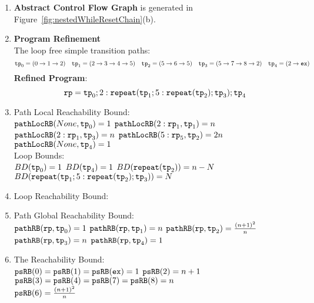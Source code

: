 \begin{enumerate}
  \item  \textbf{Abstract Control Flow Graph} is generated in Figure~\ref{fig:nestedWhileResetChain}(b).

  \item \textbf{Program Refinement}
  \\
  The loop free simple transition paths:
  \[
          \mathtt{tp}_0 = (0 \to 1 \to 2)
          \quad
          \mathtt{tp}_1 = (2 \to 3 \to 4 \to 5)
          \quad           
          \mathtt{tp}_2 = (5 \to 6 \to 5)
          \quad
          \mathtt{tp}_3 = (5 \to 7 \to 8 \to 2)
          \quad
          \mathtt{tp}_4 = (2 \to \mathtt{ex})
      \]
  \textbf{Refined Program}:
  \[
  \mathtt{rp} = \mathtt{tp}_0 ; 2: \mathtt{repeat}(\mathtt{tp}_1; 5: \mathtt{repeat}(\mathtt{tp}_2); \mathtt{tp}_3); \mathtt{tp}_4
  \]
\item {Path Local Reachability Bound}:
\\
$\mathtt{pathLocRB}(None, \mathtt{tp}_0) = 1$ \quad
$\mathtt{pathLocRB}(2: \mathtt{rp}_1, \mathtt{tp}_1) = n$ \quad
$\mathtt{pathLocRB}(2: \mathtt{rp}_1, \mathtt{tp}_3) = n$ \quad
$\mathtt{pathLocRB}(5: \mathtt{rp}_5, \mathtt{tp}_2) = 2n$ \\
$\mathtt{pathLocRB}(None, \mathtt{tp}_4) = 1$
%
\\
Loop Bounds:
\\
$BD(\mathtt{tp}_0) = 1$
\quad
$BD(\mathtt{tp}_4) = 1$
\quad
$BD(\mathtt{repeat}(\mathtt{tp}_2)) = n - N $
\quad
$BD(\mathtt{repeat}(\mathtt{tp}_1; 5: \mathtt{repeat}(\mathtt{tp}_2); \mathtt{tp}_3)) = N $
%
\item Loop Reachability Bound:
\\
%
%
\item Path Global Reachability Bound:
\\
$\mathtt{pathRB}(\mathtt{rp}, \mathtt{tp}_0) = 1$ \quad
$\mathtt{pathRB}(\mathtt{rp}, \mathtt{tp}_1) = n$ \quad
$\mathtt{pathRB}(\mathtt{rp}, \mathtt{tp}_2) = \frac{(n + 1)^2}{n}$ \quad
$\mathtt{pathRB}(\mathtt{rp}, \mathtt{tp}_3) = n$ \quad
$\mathtt{pathRB}(\mathtt{rp}, \mathtt{tp}_4) = 1$
%
\item The Reachability Bound:
\\
$\mathtt{psRB}(0) = \mathtt{psRB}(1) = \mathtt{psRB}(\mathtt{ex}) = 1$ \quad
$\mathtt{psRB}(2) = n + 1$ \quad
$\mathtt{psRB}(3) = \mathtt{psRB}(4) =\mathtt{psRB}(7) = \mathtt{psRB}(8) = n$ \quad \\
$\mathtt{psRB}(6) = \frac{(n + 1)^2}{n} $ \quad
{}
\end{enumerate}